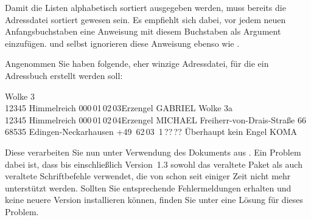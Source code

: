 Damit die Listen alphabetisch sortiert ausgegeben werden, muss bereits die
Adressdatei sortiert gewesen sein. Es empfiehlt sich dabei, vor jedem neuen
Anfangsbuchstaben eine Anweisung  mit diesem Buchstaben als
Argument einzufügen.  und  selbst
ignorieren diese Anweisung ebenso wie .
%
\begin{Example}
  Angenommen Sie haben folgende, eher winzige Adressdatei, für die ein
  Adressbuch erstellt werden soll:
\begin{lstcode}
           {Wolke 3\\12345 Himmelreich}
           {000\,01\,02\,03}{}{}{Erzengel}
           {GABRIEL}
           {Wolke 3a\\12345 Himmelreich}
           {000\,01\,02\,04}{}{}{Erzengel}
           {MICHAEL}
           {Freiherr-von-Drais-Stra\ss e 66\\
             68535 Edingen-Neckarhausen}
           {+49~62\,03~1\,??\,??}{}{}
           {\"Uberhaupt kein Engel}
           {KOMA}
\end{lstcode}
  Diese verarbeiten Sie nun unter Verwendung des Dokuments 
  aus \cite{package:adrconv}. Ein Problem dabei ist, dass 
  bis einschließlich Version~1.3 sowohl das veraltete Paket 
  als auch veraltete Schriftbefehle verwendet, die von \KOMAScript{} schon
  seit einiger Zeit nicht mehr unterstützt werden. Sollten Sie entsprechende
  Fehlermeldungen erhalten und keine neuere Version installieren können,
  finden Sie unter \cite{https://komascript.de/node/2154} eine Lösung für
  dieses Problem.


\end{Example}
